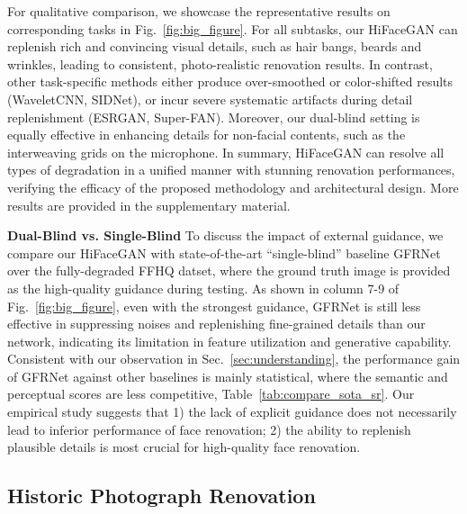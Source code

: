 \documentclass[sigconf]{acmart}
\begin{document}
For qualitative comparison, we showcase the representative results on corresponding tasks in Fig.~\ref{fig:big_figure}. For all subtasks, our HiFaceGAN can replenish rich and convincing visual details, such as hair bangs, beards and wrinkles, leading to consistent, photo-realistic renovation results. In contrast, other task-specific methods either produce over-smoothed or color-shifted results (WaveletCNN, SIDNet), or incur severe systematic artifacts during detail replenishment (ESRGAN, Super-FAN). Moreover, our dual-blind setting is equally effective in enhancing details for non-facial contents, such as the interweaving grids on the microphone. In summary, HiFaceGAN can resolve all types of degradation in a unified manner with stunning renovation performances, verifying the efficacy of the proposed methodology and architectural design. More results are provided in the supplementary material.


\textbf{Dual-Blind vs. Single-Blind}
To discuss the impact of external guidance, we compare our HiFaceGAN with state-of-the-art ``single-blind'' baseline GFRNet~\cite{BlindFR-ECCV2018} over the fully-degraded FFHQ datset, where the ground truth image is provided as the high-quality guidance during testing. As shown in column 7-9 of Fig.~\ref{fig:big_figure}, even with the strongest guidance, GFRNet is still less effective in suppressing noises and replenishing fine-grained details than our network, indicating its limitation in feature utilization and generative capability. Consistent with our observation in Sec.~\ref{sec:understanding}, the performance gain of GFRNet against other baselines is mainly statistical, where the semantic and perceptual scores are less competitive, Table~\ref{tab:compare_sota_sr}. Our empirical study suggests that 1) the lack of explicit guidance does not necessarily lead to inferior performance of face renovation; 2) the ability to replenish plausible details is most crucial for high-quality face renovation.

\subsection{Historic Photograph Renovation}\label{sec:HPR}
\end{document}
